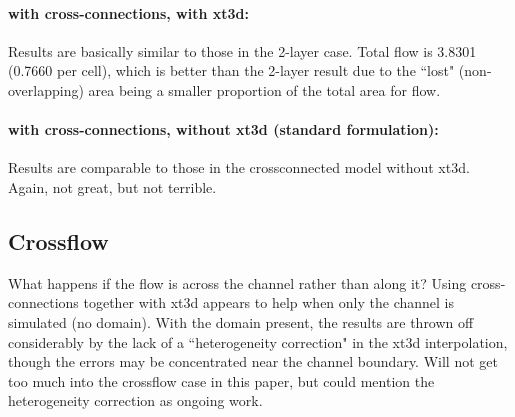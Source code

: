 \documentclass{article}
\begin{document}
\paragraph{with cross-connections, with xt3d:} Results are basically similar to those in the 2-layer case. Total flow is 3.8301 (0.7660 per cell), which is better than the 2-layer result due to the ``lost" (non-overlapping) area being a smaller proportion of the total area for flow.

\paragraph{with cross-connections, without xt3d (standard formulation):} Results are comparable to those in the crossconnected model without xt3d. Again, not great, but not terrible.

\subsection{Crossflow}
What happens if the flow is across the channel rather than along it? Using cross-connections together with xt3d appears to help when only the channel is simulated (no domain). With the domain present, the results are thrown off considerably by the lack of a ``heterogeneity correction" in the xt3d interpolation, though the errors may be concentrated near the channel boundary.  Will not get too much into the crossflow case in this paper, but could mention the heterogeneity correction as ongoing work.
\end{document}
